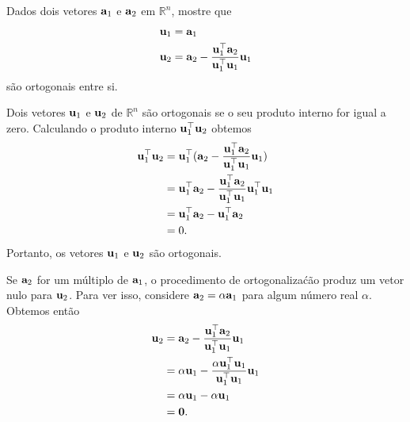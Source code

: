 
\label{ex:gram-schmidt} 

\begin{exenumerate}
    \item Dados dois vetores $\mathbf{a}_1$ e $\mathbf{a}_2$ em $\mathbb{R}^n$, mostre que 
    \begin{align}
        \mathbf{u}_1 &= \mathbf{a}_1 \\
        \mathbf{u}_2 &= \mathbf{a}_2 - \frac{\mathbf{u}_1^\top \mathbf{a}_2}{\mathbf{u}_1^\top \mathbf{u}_1}\mathbf{u}_1
    \end{align}
    s\~ao ortogonais entre si.
    \begin{solution}
        Dois vetores $\mathbf{u}_1$ e $\mathbf{u}_2$ de $\mathbb{R}^n$ s\~ao ortogonais
        se o seu produto interno for igual a zero. Calculando o produto interno $\mathbf{u}_1^\top \mathbf{u}_2$ obtemos
        \begin{align}
            \mathbf{u}_1^{\top}\mathbf{u}_2 &= \mathbf{u}_1^\top(\mathbf{a}_2 - \frac{\mathbf{u}_1^\top\mathbf{a}_2}{\mathbf{u}_1^\top\mathbf{u}_1}\mathbf{u}_1) \\
            &= \mathbf{u}_1^\top\mathbf{a}_2 - \frac{\mathbf{u}_1^\top\mathbf{a}_2}{\mathbf{u}_1^\top\mathbf{u}_1}\mathbf{u}_1^\top\mathbf{u}_1 \\
            &= \mathbf{u}_1^\top\mathbf{a}_2 - \mathbf{u}_1^\top\mathbf{a}_2 \\
            &= 0.
        \end{align}
        Portanto, os vetores $\mathbf{u}_1$ e $\mathbf{u}_2$ s\~ao ortogonais.
        
        Se $\mathbf{a}_2$ for um m\'ultiplo de $\mathbf{a}_1$, o procedimento de ortogonaliza\'c\~ao produz
        um vetor nulo para $\mathbf{u}_2$. Para ver isso, considere $\mathbf{a}_2 = \alpha \mathbf{a}_1$ para algum
        n\'umero real $\alpha$. Obtemos ent\~ao
        \begin{align} \mathbf{u}_2 &= \mathbf{a}_2 - \frac{\mathbf{u}_1^\top \mathbf{a}_2}{\mathbf{u}_1^\top \mathbf{u}_1}\mathbf{u}_1\\
            &= \alpha \mathbf{u}_1 - \frac{\alpha \mathbf{u}_1^\top \mathbf{u}_1}{\mathbf{u}_1^\top \mathbf{u}_1}\mathbf{u}_1\\
            &= \alpha \mathbf{u}_1 - \alpha \mathbf{u}_1\\ &=\mathbf{0}.
        \end{align}
    \end{solution}
    

\end{exenumerate}
